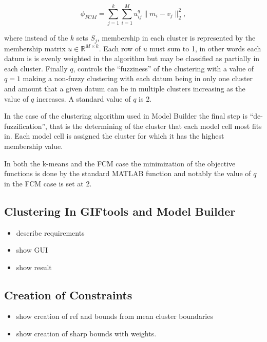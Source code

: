 \begin{equation}
 \phi_{FCM} = \sum_{j=1}^k\sum_{i = 1}^Mu^q_{ij}\|m_i - v_j\|_2^2,\label{eq:fcm}
\end{equation}

where instead of the $k$ sets $S_j$, membership in each cluster is represented by the membership matrix $u \in \mathbb R^{M\times k}$. Each row of $u$ must sum to 1, in other words each datum is is evenly weighted in the algorithm but may be classified as partially in each cluster. Finally $q$, controls the ``fuzziness'' of the clustering with a value of $q = 1$ making a non-fuzzy clustering with each datum being in only one cluster and amount that a given datum can be in multiple clusters increasing as the value of $q$ increases. A standard value of $q$ is 2.

In the case of the clustering algorithm used in Model Builder the final step is ``de-fuzzification'', that is the determining of the cluster that each model cell most fits in. Each model cell is assigned the cluster for which it has the highest membership value.

In both the k-means and the \ac{FCM} case the minimization of the objective functions is done by the standard MATLAB function and notably the value of $q$ in the \ac{FCM} case is set at 2.

\subsection{Clustering In GIFtools and Model Builder}
\label{subsec:clusterTools}

\begin{itemize}
 \item describe requirements
 \item show GUI
 \item show result
\end{itemize}

\subsection{Creation of Constraints}
\label{subsec:clusterConstraints}

\begin{itemize}
 \item show creation of ref and bounds from mean cluster boundaries
 \item show creation of sharp bounds with weights.
\end{itemize}

